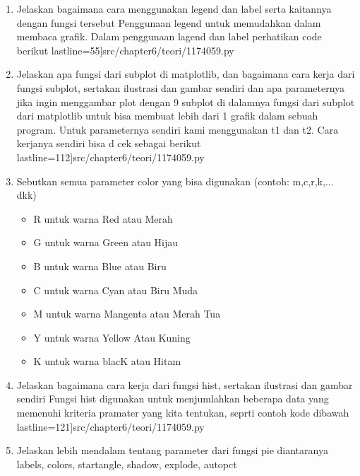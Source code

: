 \begin {enumerate}
\begin {enumerate}
						 lastline=83]{src/chapter6/teori/1174059.py}
				\end {enumerate}
		\item Jelaskan bagaimana cara menggunakan legend dan label serta kaitannya dengan fungsi tersebut
		\newline Penggunaan legend untuk memudahkan dalam membaca grafik. Dalam penggunaan lagend dan label perhatikan code berikut
			 lastline=55]{src/chapter6/teori/1174059.py}
		\item Jelaskan apa fungsi dari subplot di matplotlib, dan bagaimana cara kerja dari fungsi subplot, sertakan ilustrasi dan gambar sendiri dan apa parameternya jika ingin menggambar plot dengan 9 subplot di dalamnya
		\newline fungsi dari subplot dari matplotlib untuk bisa membuat lebih dari 1 grafik dalam sebuah program. Untuk parameternya sendiri kami menggunakan t1 dan t2. Cara kerjanya sendiri bisa d cek sebagai berikut
			 lastline=112]{src/chapter6/teori/1174059.py}
		\item Sebutkan semua parameter color yang bisa digunakan (contoh: m,c,r,k,... dkk)
			\begin {itemize}
				\item R untuk warna Red atau Merah
				\item G untuk warna Green atau Hijau
				\item B untuk warna Blue atau Biru
				\item C untuk warna Cyan atau Biru Muda
				\item M untuk warna Mangenta atau Merah Tua
				\item Y untuk warna Yellow Atau Kuning
				\item K untuk warna blacK atau Hitam
			\end {itemize}
		\item Jelaskan bagaimana cara kerja dari fungsi hist, sertakan ilustrasi dan gambar sendiri
		\newline  Fungsi hist digunakan untuk menjumlahkan beberapa data yang memenuhi kriteria pramater yang kita tentukan, seprti contoh kode dibawah
			 lastline=121]{src/chapter6/teori/1174059.py}
		\item Jelaskan lebih mendalam tentang parameter dari fungsi pie diantaranya labels, colors, startangle, shadow, explode, autopct
			\newline  
			\begin{itemize}

\end{itemize}
\end{enumerate}
